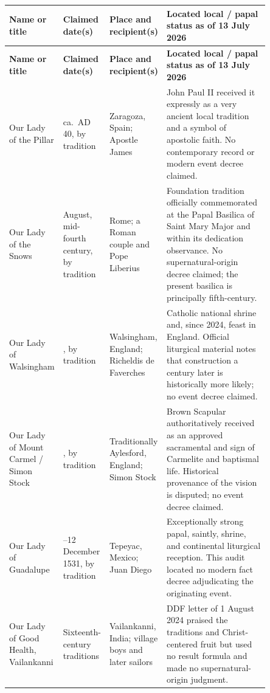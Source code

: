 \begingroup
\footnotesize
\renewcommand{\arraystretch}{1.12}
\setlength{\LTpre}{0.4em}
\setlength{\LTpost}{0pt}
\begin{longtable}{>{\raggedright\arraybackslash}p{0.145\linewidth}>{\raggedright\arraybackslash}p{0.115\linewidth}>{\raggedright\arraybackslash}p{0.17\linewidth}>{\raggedright\arraybackslash}p{0.42\linewidth}}
\toprule
\textbf{Name or title} & \textbf{Claimed date(s)} & \textbf{Place and recipient(s)} & \textbf{Located local / papal status as of 13 July 2026}\\
\midrule
\endfirsthead
\toprule
\textbf{Name or title} & \textbf{Claimed date(s)} & \textbf{Place and recipient(s)} & \textbf{Located local / papal status as of 13 July 2026}\\
\midrule
\endhead
Our Lady of the Pillar & ca.~AD 40, by tradition & Zaragoza, Spain; Apostle James & John Paul II received it expressly as a very ancient local tradition and a symbol of apostolic faith. No contemporary record or modern event decree claimed.\\
Our Lady of the Snows & 5 August, mid-fourth century, by tradition & Rome; a Roman couple and Pope Liberius & Foundation tradition officially commemorated at the Papal Basilica of Saint Mary Major and within its dedication observance. No supernatural-origin decree claimed; the present basilica is principally fifth-century.\\
Our Lady of Walsingham & 1061, by tradition & Walsingham, England; Richeldis de Faverches & Catholic national shrine and, since 2024, feast in England. Official liturgical material notes that construction a century later is historically more likely; no event decree claimed.\\
Our Lady of Mount Carmel / Simon Stock & 1251, by tradition & Traditionally Aylesford, England; Simon Stock & Brown Scapular authoritatively received as an approved sacramental and sign of Carmelite and baptismal life. Historical provenance of the vision is disputed; no event decree claimed.\\
Our Lady of Guadalupe & 9--12 December 1531, by tradition & Tepeyac, Mexico; Juan Diego & Exceptionally strong papal, saintly, shrine, and continental liturgical reception. This audit located no modern fact decree adjudicating the originating event.\\
Our Lady of Good Health, Vailankanni & Sixteenth-century traditions & Vailankanni, India; village boys and later sailors & DDF letter of 1 August 2024 praised the traditions and Christ-centered fruit but used no result formula and made no supernatural-origin judgment.\\

\end{longtable}
